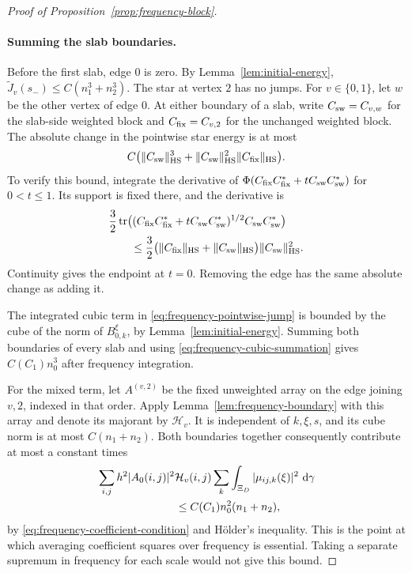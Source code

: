 \begin{proof}[Proof of Proposition~\ref{prop:frequency-block}]
\paragraph{Summing the slab boundaries.}
Before the first slab, edge $0$ is zero.  By
Lemma~\ref{lem:initial-energy},
$\widetilde J_v(s_-)\leq C(n_1^3+n_2^3)$.
The star at vertex $2$ has no jumps.  For $v\in\{0,1\}$, let
$w$ be the other vertex of edge $0$.  At either boundary of a
slab, write $C_{\rm sw}=C_{v,w}$ for the slab-side weighted block and
$C_{\rm fix}=C_{v,2}$ for the unchanged weighted block.
The absolute change in the pointwise star
energy is at most
\begin{equation}\label{eq:frequency-pointwise-jump}
 C\bigl(\|C_{\rm sw}\|_{\mathrm{HS}}^3
       +\|C_{\rm sw}\|_{\mathrm{HS}}^2\|C_{\rm fix}\|_{\mathrm{HS}}\bigr).
\end{equation}
To verify this bound, integrate the derivative of
$\Phi(C_{\rm fix}C_{\rm fix}^*+tC_{\rm sw}C_{\rm sw}^*)$
for $0<t\leq1$. Its support is fixed there,
and the derivative is
\[
 \begin{aligned}
 &\frac32\operatorname{tr}\bigl((C_{\rm fix}C_{\rm fix}^*
                   +tC_{\rm sw}C_{\rm sw}^*)^{1/2}
                    C_{\rm sw}C_{\rm sw}^*\bigr)\\
 &\qquad\leq\frac32\bigl(\|C_{\rm fix}\|_{\mathrm{HS}}
                    +\|C_{\rm sw}\|_{\mathrm{HS}}\bigr)
                      \|C_{\rm sw}\|_{\mathrm{HS}}^2.
 \end{aligned}
\]
Continuity gives the endpoint at $t=0$.  Removing the edge has
the same absolute change as adding it.

The integrated cubic term in
\eqref{eq:frequency-pointwise-jump} is bounded by the cube of
the norm of $B_{0,k}^\xi$, by
Lemma~\ref{lem:initial-energy}.  Summing both boundaries of
every slab and using \eqref{eq:frequency-cubic-summation} gives
$C(C_1)n_0^3$ after frequency integration.

For the mixed term, let $A^{(v,2)}$ be the fixed unweighted array on
the edge joining $v,2$, indexed in that order. Apply
Lemma~\ref{lem:frequency-boundary} with this array and denote its
majorant by $\mathcal H_v$. It is independent of $k,\xi,s$, and its cube norm is
at most $C(n_1+n_2)$.  Both boundaries together consequently
contribute at most a constant times
\begin{align*}
 &\sum_{i,j}h^2|A_0(i,j)|^2\mathcal H_v(i,j)
       \sum_k\int_{\Xi_D}|\mu_{ij,k}(\xi)|^2\,\dd\gamma\\
 &\hspace{25mm}\leq C(C_1)n_0^2(n_1+n_2),
\end{align*}
by \eqref{eq:frequency-coefficient-condition} and H\"older's
inequality.  This is the point at which averaging coefficient
squares over frequency is essential.  Taking a separate supremum
in frequency for each scale would not give this bound.


\end{proof}
